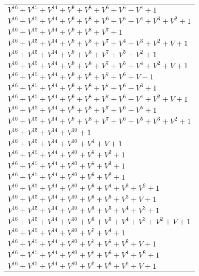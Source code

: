 \documentclass[12pt]{article}
\begin{document}
\begin{adjustwidth}{-4cm}{}
\begin{center}
\begin{longtable}{|l|}
$V^{16}  +V^{15}  +V^{14}  +V^{9}  +V^{8}  +V^{6}  +V^{5}  +V^{4}  + 1$ \\
$V^{16}  +V^{15}  +V^{14}  +V^{9}  +V^{8}  +V^{6}  +V^{5}  +V^{4}  +V^{3}  +V^{2}  + 1$ \\
$V^{16}  +V^{15}  +V^{14}  +V^{9}  +V^{8}  +V^{7}  + 1$ \\
$V^{16}  +V^{15}  +V^{14}  +V^{9}  +V^{8}  +V^{7}  +V^{4}  +V^{3}  +V^{2}  + V + 1$ \\
$V^{16}  +V^{15}  +V^{14}  +V^{9}  +V^{8}  +V^{7}  +V^{5}  +V^{2}  + 1$ \\
$V^{16}  +V^{15}  +V^{14}  +V^{9}  +V^{8}  +V^{7}  +V^{5}  +V^{4}  +V^{2}  + V + 1$ \\
$V^{16}  +V^{15}  +V^{14}  +V^{9}  +V^{8}  +V^{7}  +V^{6}  + V + 1$ \\
$V^{16}  +V^{15}  +V^{14}  +V^{9}  +V^{8}  +V^{7}  +V^{6}  +V^{3}  + 1$ \\
$V^{16}  +V^{15}  +V^{14}  +V^{9}  +V^{8}  +V^{7}  +V^{6}  +V^{4}  +V^{2}  + V + 1$ \\
$V^{16}  +V^{15}  +V^{14}  +V^{9}  +V^{8}  +V^{7}  +V^{6}  +V^{5}  + 1$ \\
$V^{16}  +V^{15}  +V^{14}  +V^{9}  +V^{8}  +V^{7}  +V^{6}  +V^{5}  +V^{3}  +V^{2}  + 1$ \\
$V^{16}  +V^{15}  +V^{14}  +V^{10}  + 1$ \\
$V^{16}  +V^{15}  +V^{14}  +V^{10}  +V^{4}  + V + 1$ \\
$V^{16}  +V^{15}  +V^{14}  +V^{10}  +V^{5}  +V^{2}  + 1$ \\
$V^{16}  +V^{15}  +V^{14}  +V^{10}  +V^{5}  +V^{3}  + 1$ \\
$V^{16}  +V^{15}  +V^{14}  +V^{10}  +V^{6}  +V^{2}  + 1$ \\
$V^{16}  +V^{15}  +V^{14}  +V^{10}  +V^{6}  +V^{4}  +V^{3}  +V^{2}  + 1$ \\
$V^{16}  +V^{15}  +V^{14}  +V^{10}  +V^{6}  +V^{5}  +V^{3}  + V + 1$ \\
$V^{16}  +V^{15}  +V^{14}  +V^{10}  +V^{6}  +V^{5}  +V^{4}  +V^{3}  + 1$ \\
$V^{16}  +V^{15}  +V^{14}  +V^{10}  +V^{6}  +V^{5}  +V^{4}  +V^{3}  +V^{2}  + V + 1$ \\
$V^{16}  +V^{15}  +V^{14}  +V^{10}  +V^{7}  +V^{4}  + 1$ \\
$V^{16}  +V^{15}  +V^{14}  +V^{10}  +V^{7}  +V^{5}  +V^{2}  + V + 1$ \\
$V^{16}  +V^{15}  +V^{14}  +V^{10}  +V^{7}  +V^{6}  +V^{4}  +V^{2}  + 1$ \\
$V^{16}  +V^{15}  +V^{14}  +V^{10}  +V^{7}  +V^{6}  +V^{5}  + V + 1$ \\

\end{longtable}
\end{center}
\end{adjustwidth}
\end{document}
